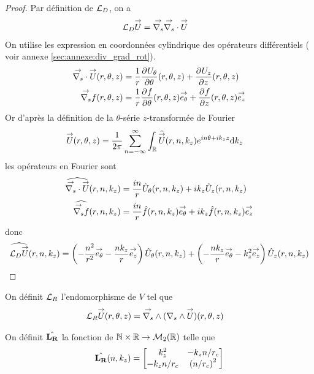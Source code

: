     \begin{proof}
      Par définition de \(\LD\), on a
      \begin{align*}
        \LD \vect{U} & = \vgrads{} \vdivs{} \vect{U}
      \end{align*}
      On utilise les expression en coordonnées cylindrique des opérateurs différentiels ( voir annexe \ref{sec:annexe:div_grad_rot}).
      \begin{align*}
        \vdivs{\vect{U}}(r,\theta,z) &= \frac{1}{r}\ddr{\theta}{U_\theta}(r,\theta,z) + \ddr{z}{U_z}(r,\theta,z)
        \\
        \vgrads{f}(r,\theta,z) &= \frac{1}{r}\ddr{\theta}{f}(r,\theta,z)\vect{e_\theta} + \ddr{z}{f}(r,\theta,z)\vect{e_z}
      \end{align*}
      Or d’après la définition de la \(\theta\)-série \(z\)-transformée de Fourier
      \begin{align*}
        \vect{U}(r,\theta,z) & = \frac{1}{2\pi}\sum_{n=-\infty}^\infty \int_\RR \hat{\vect{U}}(r,n,k_z)e^{in\theta + ik_zz}\dd{k_z}
      \end{align*}
      les opérateurs en Fourier sont
      \begin{align*}
        \widehat{\vdivs{\vect{U}}}(r,n,k_z) &= \frac{in}{r}{\hat{U}_\theta}(r,n,k_z) + ik_z{\hat{U}_z}(r,n,k_z)
        \\
        \widehat{\vgrads{f}}(r,n,k_z) &= \frac{in}{r}\hat{f}(r,n,k_z)\vect{e_\theta} + ik_z\hat{f}(r,n,k_z)\vect{e_z}
      \end{align*}
      donc
      \begin{align*}
        \widehat{\LD{\vect{U}}}(r,n,k_z) =  \left(-\frac{n^2}{r^2}\vect{e_\theta} - \frac{nk_z}{r}\vect{e_z}\right){\hat{U}_\theta}(r,n,k_z) + \left(-\frac{nk_z}{r}\vect{e_\theta} - {k_z^2}\vect{e_z}\right){\hat{U}_z}(r,n,k_z)
      \end{align*}

    \end{proof}


    \begin{defn}
      \label{eq:cylindre:fourier:LR}

      On définit \(\LR\) l'endomorphisme de \(V\) tel que
      \begin{align*}
        \LR \vect{U}(r,\theta,z) & = \vrots{} (\rots{} \vect{U})(r,\theta,z)
      \end{align*}

      On définit \(\hat{\mLR}\) la fonction de \(\NN\times\RR \rightarrow \mathcal{M}_2(\RR)\) telle que
      \begin{equation*}
        \hat{\mLR}(n,k_z) = 
        \begin{bmatrix}
          k_z^2 & -k_z{n}\slash{r_c}
          \\
          -k_z{n}\slash{r_c} & \left({n}\slash{r_c}\right)^2
        \end{bmatrix}
      \end{equation*}
    \end{defn}

